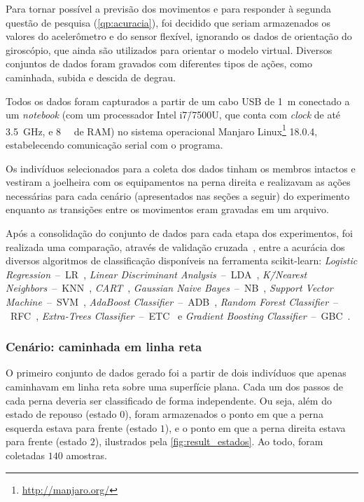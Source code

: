Para tornar possível a previsão dos movimentos e para responder à segunda questão de pesquisa (\ref{qp:acuracia}), foi decidido que seriam armazenados os valores do acelerômetro e do sensor flexível, ignorando os dados de orientação do giroscópio, que ainda são utilizados para orientar o modelo virtual. Diversos conjuntos de dados foram gravados com diferentes tipos de ações, como caminhada, subida e descida de degrau.

Todos os dados foram capturados a partir de um cabo USB de \SI{1}{\meter} conectado a um \textit{notebook} (com um processador Intel i7\=/7500U, que conta com \textit{clock} de até \SI{3.5}{\giga\hertz}, e \SI{8}{\giga\byte} de RAM) no sistema operacional Manjaro Linux\footnote{\url{http://manjaro.org/}} 18.0.4, estabelecendo comunicação serial com o programa.

Os indivíduos selecionados para a coleta dos dados tinham os membros intactos e vestiram a joelheira com os equipamentos na perna direita e realizavam as ações necessárias para cada cenário (apresentados nas seções a seguir) do experimento enquanto as transições entre os movimentos eram gravadas em um arquivo.

Após a consolidação do conjunto de dados para cada etapa dos experimentos, foi realizada uma comparação, através de validação cruzada~\cite{scikit:crossval}, entre a acurácia dos diversos algoritmos de classificação disponíveis na ferramenta scikit-learn:
\textit{Logistic Regression}~--~LR~\cite{scikit:lr},
\textit{Linear Discriminant Analysis}~--~LDA~\cite{scikit:lda},
\textit{K\=/Nearest Neighbors}~--~KNN~\cite{scikit:knn},
\textit{CART}~\cite{scikit:cart},
\textit{Gaussian Naive Bayes}~--~NB~\cite{scikit:nb},
\textit{Support Vector Machine}~--~SVM~\cite{scikit:svm},
\textit{AdaBoost Classifier}~--~ADB~\cite{scikit:adb},
\textit{Random Forest Classifier}~--~RFC~\cite{scikit:rfc},
\textit{Extra-Trees Classifier}~--~ETC~\cite{scikit:etc} e
\textit{Gradient Boosting Classifier}~--~GBC~\cite{scikit:gbc}.

\subsubsection{Cenário: caminhada em linha reta}

O primeiro conjunto de dados gerado foi a partir de dois indivíduos que apenas caminhavam em linha reta sobre uma superfície plana. Cada um dos passos de cada perna deveria ser classificado de forma independente. Ou seja, além do estado de repouso (estado \(0\)), foram armazenados o ponto em que a perna esquerda estava para frente (estado \(1\)), e o ponto em que a perna direita estava para frente (estado \(2\)), ilustrados pela \autoref{fig:result_estados}. Ao todo, foram coletadas \(140\) amostras.

